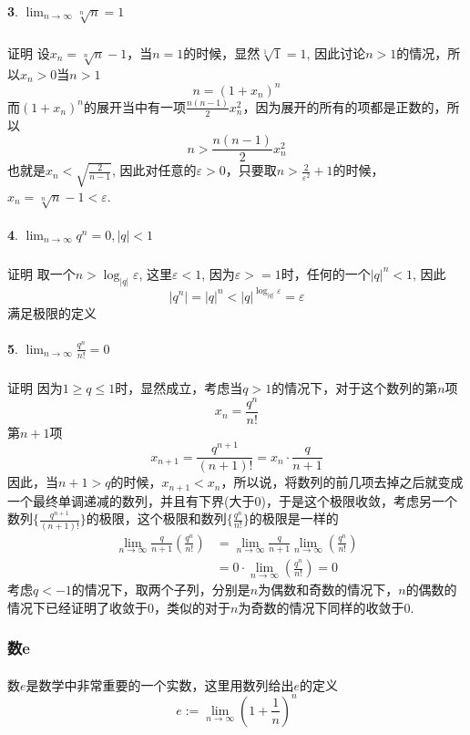 \paragraph{}
\textbf{3}. $\lim_{n\to \infty} \sqrt[n]{n} = 1$
\subparagraph{}
证明\:  设$x_n = \sqrt[n]{n} - 1$，当$n=1$的时候，显然$\sqrt[1]{1} = 1$, 因此讨论$n > 1$的情况，所以$x_n > 0$当$n > 1$
$$
n = (1 + x_n)^n
$$
而$(1 + x_n)^n$的展开当中有一项$\frac{n(n-1)}{2} x_n^2$，因为展开的所有的项都是正数的，所以
$$
n > \frac{n(n-1)}{2} x_n^2
$$
也就是$x_n < \sqrt{\frac{2}{n-1}}$, 因此对任意的$\varepsilon > 0$，只要取$n > \frac{2}{\varepsilon^2} + 1$的时候，$x_n = \sqrt[n]{n} - 1 < \varepsilon$.

\paragraph{}
\textbf{4}. $\lim_{n\to \infty} q^n = 0, |q| < 1$
\subparagraph{}
证明\:  取一个$n >\log_{|q|} \varepsilon $, 这里$\varepsilon < 1$, 因为$\varepsilon >= 1$时，任何的一个$|q|^n < 1$, 因此
$$
|q^n| = |q|^n < |q|^{\log_{|q|} \varepsilon}  =  \varepsilon
$$
满足极限的定义


\paragraph{}
\textbf{5}. $\lim_{n\to \infty} \frac{q^n}{n!} = 0$
\subparagraph{}
证明\:  因为$1 \geq q \leq 1$时，显然成立，考虑当$q > 1$的情况下，对于这个数列的第$n$项
$$
x_n = \frac{q^n}{n!}
$$
第$n+1$项
$$
x_{n+1} = \frac{q^{n+1}}{(n+1)!} = x_n \cdot \frac{q}{n+1}
$$
因此，当$n+1 > q$的时候，$x_{n+1} < x_n$，所以说，将数列的前几项去掉之后就变成一个最终单调递减的数列，并且有下界(大于$0$)，于是这个极限收敛，考虑另一个数列$\{\frac{q^{n+1}}{(n+1)!}\}$的极限，这个极限和数列$\{ \frac{q^n}{n!} \}$的极限是一样的
\begin{align*}
\lim_{n \to \infty} \frac{q}{n+1}  (\frac{q^n}{n!}) & =\lim_{n \to \infty} \frac{q}{n+1}  \lim_{n \to \infty}  (\frac{q^n}{n!})  \\
&= 0 \cdot \lim_{n \to \infty}  (\frac{q^n}{n!})  = 0
\end{align*}
考虑$q < -1$的情况下，取两个子列，分别是$n$为偶数和奇数的情况下，$n$的偶数的情况下已经证明了收敛于$0$，类似的对于$n$为奇数的情况下同样的收敛于$0$.

\subsubsection{数e}
\paragraph{}
数$e$是数学中非常重要的一个实数，这里用数列给出$e$的定义
$$
e := \lim_{n\to \infty} (1 + \frac{1}{n})^n
$$


